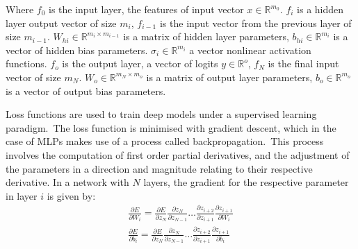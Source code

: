 \noindent Where $ f_0 $ is the input layer, the features of input vector $ x \in \mathbb{R}^{m_0} $. $ f_i $ is a hidden layer output vector of size $ m_i $, $ f_{i - 1} $ is the input vector from the previous layer of size $ m_{i-1} $. $ W_{hi} \in \mathbb{R}^{m_i \times m_{i - 1}} $ is a matrix of hidden layer parameters, $ b_{hi} \in \mathbb{R}^{m_i} $ is a vector of hidden bias parameters. $ \sigma_i \in \mathbb{R}^{m_i} $ a vector nonlinear activation functions. $ f_o $ is the output layer, a vector of logits $ y \in \mathbb{R}^o $, $ f_N $ is the final input vector of size $ m_{N} $. $ W_{o} \in \mathbb{R}^{m_N \times m_o} $ is a matrix of output layer parameters, $ b_{o} \in \mathbb{R}^{m_o} $ is a vector of output bias parameters.

\noindent Loss functions are used to train deep models under a supervised learning paradigm.\ The loss function is minimised with gradient descent, which in the case of MLPs makes use of a process called backpropagation.\ This process involves the computation of first order partial derivatives, and the adjustment of the parameters in a direction and magnitude relating to their respective derivative. In a network with $ N $ layers, the gradient for the respective parameter in layer $ i $ is given by:
\begin{subequations}
	\begin{gather}
		\frac{\partial E} {\partial W_i} = \frac{\partial E} {\partial z_N}\frac{\partial z_N} {\partial z_{N - 1}}  \dots \frac{\partial z_{i + 2}} {\partial z_{i + 1}}\frac{\partial z_{i + 1}} {\partial W_{i}} \\
		\frac{\partial E} {\partial b_i} = \frac{\partial E} {\partial z_N}\frac{\partial z_N} {\partial z_{N - 1}}  \dots \frac{\partial z_{i + 2}} {\partial z_{i + 1}}\frac{\partial z_{i + 1}} {\partial b_{i}}
	\end{gather}
\end{subequations}

